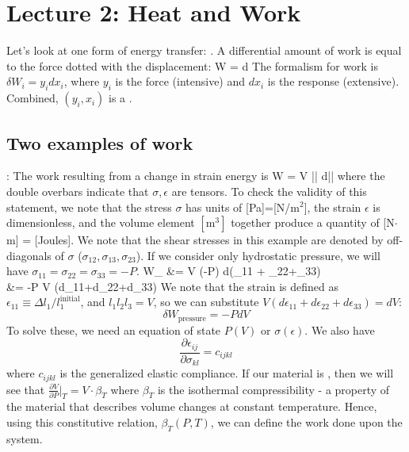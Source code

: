 \documentclass[12pt]{article}
\begin{document}

\section{Lecture 2: Heat and Work}
Let's look at one form of energy transfer: . A differential amount of work is equal to the force dotted with the displacement:
\eqs
\delta W =  \cdot d
\eqe
The formalism for work is $\delta W_i = y_i dx_i$, where $y_i$ is the force (intensive) and $dx_i$ is the response (extensive). Combined, $(y_i, x_i)$ is a .
\subsection{Two examples of work}
: The work resulting from a change in strain energy is 
\eqs
\delta W = V \bar{\bar{\sigma}} \cdot d\bar{\bar{\epsilon}}
\eqe 
where the double overbars indicate that $\sigma, \epsilon$ are tensors.  To check the validity of this statement, we note that the stress $\sigma$ has units of [Pa]=[N/$\text{m}^2$], the strain $\epsilon$ is dimensionless, and the volume element $[\text{m}^3]$ together produce a quantity of [N$\cdot$ m] = [Joules]. We note that the shear stresses in this example are denoted by off-diagonals of $\sigma$ ($\sigma_{12}, \sigma_{13}, \sigma_{23}$).  If we consider only hydrostatic pressure, we will have $\sigma_{11}=\sigma_{22}=\sigma_{33}=-P$.
\eqs
\delta W_ &= V \cdot (-P) d(\epsilon_{11} + \epsilon_{22}+\epsilon_{33})\\
&= -P V (d\epsilon_{11}+d\epsilon_{22}+d\epsilon_{33})
\eqe
We note that the strain is defined as $\epsilon_{11} \equiv \Delta l_1 / l_1^{\text{initial}}$, and $l_1 l_2 l_3 = V$, so we can substitute $V (d\epsilon_{11}+d\epsilon_{22}+d\epsilon_{33}) = dV$:
\begin{equation}
\delta W_\text{pressure} = -P dV
\end{equation}
To solve these, we need an equation of state $P(V)$ or $\sigma(\epsilon)$.  We also have
\begin{equation}
\frac{\partial \epsilon_{ij}}{\partial \sigma_{kl}} = c_{ijkl}
\end{equation}
where $c_{ijkl}$ is the generalized elastic compliance.  If our material is , then we will see that $\frac{\partial V}{\partial P}|_T = V \cdot \beta_T$ where $\beta_T$ is the isothermal compressibility - a property of the material that describes volume changes at constant temperature. Hence, using this constitutive relation, $\beta_T(P,T)$, we can define the work done upon the system. \\
\end{document}
